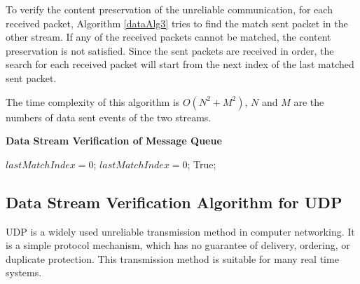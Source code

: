To verify the content preservation of the unreliable communication, for each received packet, Algorithm \ref{dataAlg3} tries to find the match sent packet in the other stream. If any of the received packets cannot be matched, the content preservation is not satisfied. Since the sent packets are received in order, the search for each received packet will start from the next index of the last matched sent packet. 

The time complexity of this algorithm is $O(N^2+M^2)$, $N$ and $M$ are the numbers of data sent events of the two streams.

\begin{algorithm}[H]
\DontPrintSemicolon
\caption{{\bf Data Stream Verification of Message Queue } \label{dataAlg3}}
\;
$lastMatchIndex = 0$;\;
$lastMatchIndex = 0$;\;
 \KwRet True;\;
\end{algorithm} 

\subsection{Data Stream Verification Algorithm for UDP}
UDP is a widely used unreliable transmission method in computer networking. It is a simple protocol mechanism, which has no guarantee of delivery, ordering, or duplicate protection. This transmission method is suitable for many real time systems. 

